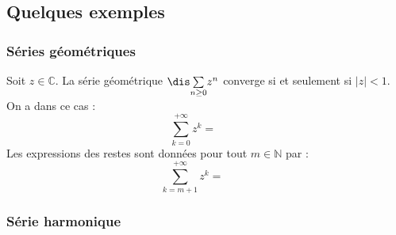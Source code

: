 \documentclass[a4paper,10pt]{report}
\newcommand{\Sum}[2]{\ensuremath{\textstyle{\sum\limits_{#1}^{#2}}}}
\begin{document}


\subsection{Quelques exemples}
\subsubsection{Séries géométriques}

\begin{thm} 
Soit $z \in \mathbb{C}$. La série géométrique $\dis \Sum{n \geq 0}{} z^n$ converge si et seulement si $\vert z \vert <1$. On a dans ce cas : 
$$ \sum_{k=0}^{+ \infty} z^k = \phantom{\frac{1}{1-z}}$$
Les expressions des restes sont données pour tout $m \in \mathbb{N}$ par :
$$ \sum_{k=m+1}^{+ \infty} z^k = \phantom{\frac{z^{m+1}}{1-z}}$$
\end{thm}

\begin{preuve}  

\vspace{9cm}
\end{preuve}

\subsubsection{Série harmonique}
\end{document}
